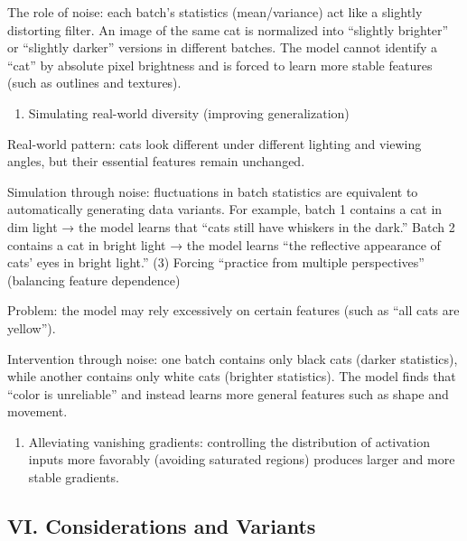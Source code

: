 The role of noise: each batch's statistics (mean/variance) act like a slightly distorting filter. An image of the same cat is normalized into ``slightly brighter'' or ``slightly darker'' versions in different batches. The model cannot identify a ``cat'' by absolute pixel brightness and is forced to learn more stable features (such as outlines and textures).

\begin{enumerate}
\def\labelenumi{(\arabic{enumi})}
\setcounter{enumi}{1}
\tightlist
\item
  Simulating real-world diversity (improving generalization)
\end{enumerate}

Real-world pattern: cats look different under different lighting and viewing angles, but their essential features remain unchanged.

Simulation through noise: fluctuations in batch statistics are equivalent to automatically generating data variants. For example, batch 1 contains a cat in dim light → the model learns that ``cats still have whiskers in the dark.'' Batch 2 contains a cat in bright light → the model learns ``the reflective appearance of cats' eyes in bright light.''
(3) Forcing ``practice from multiple perspectives'' (balancing feature dependence)

Problem: the model may rely excessively on certain features (such as ``all cats are yellow'').

Intervention through noise: one batch contains only black cats (darker statistics), while another contains only white cats (brighter statistics). The model finds that ``color is unreliable'' and instead learns more general features such as shape and movement.

\begin{enumerate}
\def\labelenumi{\arabic{enumi}.}
\setcounter{enumi}{3}
\tightlist
\item
  Alleviating vanishing gradients: controlling the distribution of activation inputs more favorably (avoiding saturated regions) produces larger and more stable gradients.
\end{enumerate}

\hypertarget{vi.-considerations-and-variants}{%
\subsection{VI. Considerations and Variants}\label{vi.-considerations-and-variants}}

